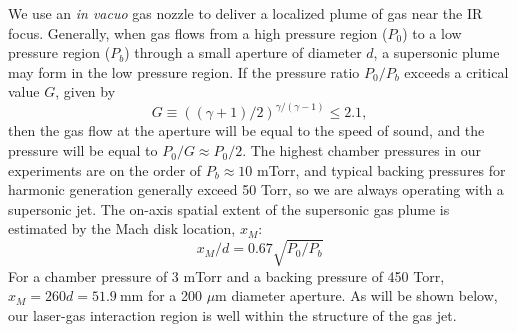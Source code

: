 
%

We use an \textit{in vacuo} gas nozzle to deliver a localized plume of gas near the IR focus. Generally, when gas flows from a high pressure region ($P_0$) to a low pressure region ($P_b$) through a small aperture of diameter $d$, a supersonic plume may form in the low pressure region. If the pressure ratio $P_0/P_b$ exceeds a critical value $G$, given by
\begin{equation}
G \equiv ((\gamma+1)/2)^{\gamma/(\gamma-1)} \le 2.1,
\label{eqn:G_factor}
\end{equation}
then the gas flow at the aperture will be equal to the speed of sound, and the pressure will be equal to $P_0 / G \approx P_0/2$. The highest chamber pressures in our experiments are on the order of $P_b \approx 10$ mTorr, and typical backing pressures for harmonic generation generally exceed 50 Torr, so we are always operating with a supersonic jet. The on-axis spatial extent of the supersonic gas plume is estimated by the Mach disk location, $x_M$:
\begin{equation}
x_M / d = 0.67 \sqrt{P_0/P_b}
\label{eqn:Mach-disk}
\end{equation}
For a chamber pressure of 3 mTorr and a backing pressure of 450 Torr, ${x_M = 260d = 51.9 \ \textrm{mm}}$ for a 200 $\mu$m diameter aperture. As will be shown below, our laser-gas interaction region is well within the structure of the gas jet.

